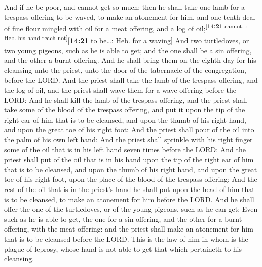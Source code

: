  And if he be poor, and cannot get so much; then he shall
take one lamb for a trespass offering to be waved, to make an atonement
for him, and one tenth deal of fine flour mingled with oil for a meat
offering, and a log of oil;\textsuperscript{{[}\textbf{14:21}
cannot\ldots: Heb. his hand reach not{]}}{[}\textbf{14:21} to be\ldots:
Heb. for a waving{]}  And two turtledoves, or two young
pigeons, such as he is able to get; and the one shall be a sin offering,
and the other a burnt offering.  And he shall bring them
on the eighth day for his cleansing unto the priest, unto the door of
the tabernacle of the congregation, before the LORD.  And
the priest shall take the lamb of the trespass offering, and the log of
oil, and the priest shall wave them for a wave offering before the LORD:
 And he shall kill the lamb of the trespass offering, and
the priest shall take some of the blood of the trespass offering, and
put it upon the tip of the right ear of him that is to be cleansed, and
upon the thumb of his right hand, and upon the great toe of his right
foot:  And the priest shall pour of the oil into the palm
of his own left hand:  And the priest shall sprinkle with
his right finger some of the oil that is in his left hand seven times
before the LORD:  And the priest shall put of the oil
that is in his hand upon the tip of the right ear of him that is to be
cleansed, and upon the thumb of his right hand, and upon the great toe
of his right foot, upon the place of the blood of the trespass offering:
 And the rest of the oil that is in the priest's hand he
shall put upon the head of him that is to be cleansed, to make an
atonement for him before the LORD.  And he shall offer
the one of the turtledoves, or of the young pigeons, such as he can get;
 Even such as he is able to get, the one for a sin
offering, and the other for a burnt offering, with the meat offering:
and the priest shall make an atonement for him that is to be cleansed
before the LORD.  This is the law of him in whom is the
plague of leprosy, whose hand is not able to get that which pertaineth
to his cleansing.

